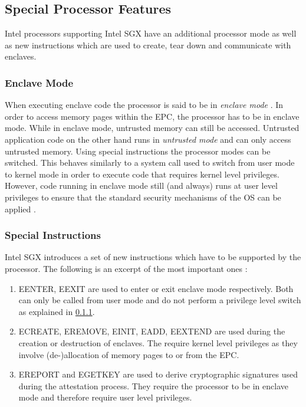 \subsection{Special Processor Features}
Intel processors supporting Intel SGX have an additional processor mode as well as new instructions which are used to create, tear down and communicate with enclaves.

\subsubsection{Enclave Mode}
\label{sec:EnclaveMode}
When executing enclave code the processor is said to be in \textit{enclave mode} \cite{Costan2016IntelSE}. In order to access memory pages within the EPC, the processor has to
be in enclave mode. While in enclave mode, untrusted memory can still be accessed. Untrusted application code on the other hand runs in \textit{untrusted mode} and can only
access untrusted memory. Using special instructions the processor modes can be switched. This behaves similarly to a system call used to switch from user mode to kernel mode in 
order to execute code that requires kernel level privileges. However, code running in enclave mode still (and always) runs at user level privileges to ensure that the standard 
security mechanisms of the OS can be applied \cite{Costan2016IntelSE}.

\subsubsection{Special Instructions}
\label{sec:Instructions}
Intel SGX introduces a set of new instructions which have to be supported by the processor. The following is an excerpt of the most important ones \cite{OverviewOfIntelSGX}:
\begin{enumerate}
    \item EENTER, EEXIT are used to enter or exit enclave mode respectively. Both can only be called from user mode and do not perform a privilege level switch as explained
          in \cref{sec:EnclaveMode}.
    \item ECREATE, EREMOVE, EINIT, EADD, EEXTEND are used during the creation or destruction of enclaves. The require kernel level privileges as they involve (de-)allocation
          of memory pages to or from the EPC.
    \item EREPORT and EGETKEY are used to derive cryptographic signatures used during the attestation process. They require the processor to be in enclave mode and therefore
          require user level privileges.
\end{enumerate}